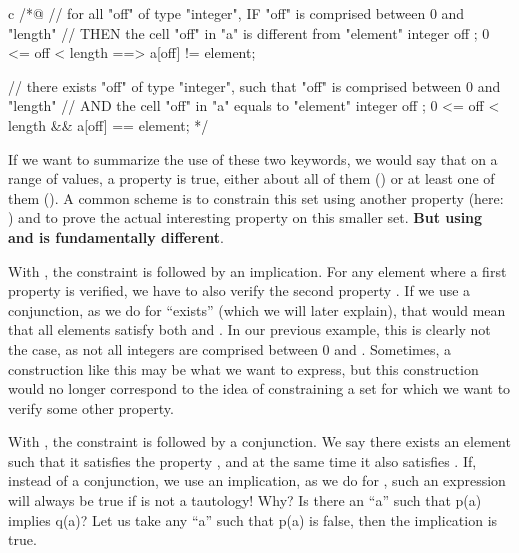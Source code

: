 \begin{CodeBlock}{c}
/*@
// for all "off" of type "integer", IF "off" is comprised between 0 and "length"
//                                  THEN the cell "off" in "a" is different from "element"
\forall integer off ; 0 <= off < length ==> a[off] != element;

// there exists "off" of type "integer", such that "off" is comprised between 0 and "length"
//                                       AND the cell "off" in "a" equals to "element"
\exists integer off ; 0 <= off < length && a[off] == element;
*/
\end{CodeBlock}


If we want to summarize the use of these two keywords, we would say that on a
range of values, a property is true, either about all of them
() or at least one of them
(). A common scheme is to constrain this set using
another property (here: ) and to prove the
actual interesting property on this smaller set. \textbf{But using
 and  is
fundamentally different}.


With ,
the constraint  is followed by an implication.
For any element where a first property  is verified, we have
to also verify the second property . If we use a conjunction,
as we do for ``exists'' (which we will later explain), that would mean that
all elements satisfy both  and . In our previous
example, this is clearly not the case, as not all integers are comprised between
0 and . Sometimes, a construction like this may be what we want to express, but
this construction would no longer correspond to the idea of constraining a set for which
we want to verify some other property.


With , the
constraint  is followed by a conjunction. We say there exists
an element such that it satisfies the property , and at the same
time it also satisfies . If, instead of a conjunction, we use an implication, as we do
for , such an expression will always be true
if  is not a tautology! Why? Is there an ``a'' such that p(a) implies
q(a)? Let us take any ``a'' such that p(a) is false, then the implication is true.



